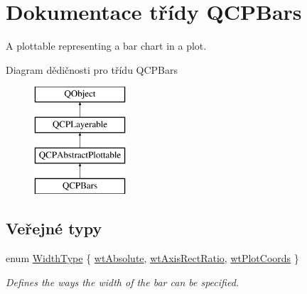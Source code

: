 \hypertarget{classQCPBars}{}\section{Dokumentace třídy Q\+C\+P\+Bars}
\label{classQCPBars}


A plottable representing a bar chart in a plot.  


Diagram dědičnosti pro třídu Q\+C\+P\+Bars\begin{figure}[H]
\begin{center}
\leavevmode
\includegraphics[height=4.000000cm]{classQCPBars}
\end{center}
\end{figure}
\subsection*{Veřejné typy}
\begin{DoxyCompactItemize}
\item 
enum \hyperlink{classQCPBars_a65dbbf1ab41cbe993d71521096ed4649}{Width\+Type} \{ \hyperlink{classQCPBars_a65dbbf1ab41cbe993d71521096ed4649ab74315c9aa77df593c58dd25dfc0de35}{wt\+Absolute}, 
\hyperlink{classQCPBars_a65dbbf1ab41cbe993d71521096ed4649a90bc09899361ad3422ff277f7c790ffe}{wt\+Axis\+Rect\+Ratio}, 
\hyperlink{classQCPBars_a65dbbf1ab41cbe993d71521096ed4649aad3cc60ae1bfb1160a30237bee9eaf10}{wt\+Plot\+Coords}
 \}\begin{DoxyCompactList}\small\item\em Defines the ways the width of the bar can be specified. \end{DoxyCompactList}
\end{DoxyCompactItemize}
